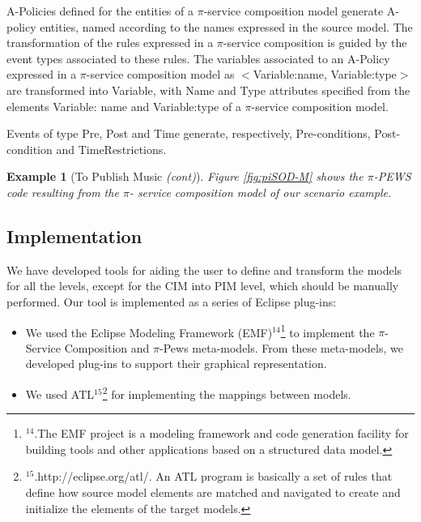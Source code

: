 \documentclass[12pt,twoside]{article}
\theoremstyle{plain}
\theoremstyle{plain}
\newtheorem{example}{Example}
\begin{document}
\begin{multicols}{2}

A-Policies defined for the entities of a $\pi$-service composition model generate {\sf A-policy} entities, named according to the names expres\-sed in the source model.
The transformation of the rules expres\-sed in a $\pi$-service composition is guided by the event types associated to these rules. 
The variables associated to an A-Policy expressed in a $\pi$-service composition model as {\sf $<$Variable:name, Variable:type$>$} are transformed into  {\sf Variable}, with  {\sf Name} and {\sf Type} attributes specified from the elements {\sf Variable: name} and {\sf Variable:type} of a $\pi$-service composition model.

Events of type {\sf Pre}, {\sf Post} and {\sf Time} generate, respectively, {\sf Pre-conditions}, {\sf Post-condition} and {\sf TimeRestrictions}.

\begin{example}[To Publish Music \textit{(cont)}]\label{ex:toPublicMusicT6}
Figure \ref{fig:piSOD-M} shows the $\pi$-PEWS code resulting from the $\pi$- service composition model  of our scenario example.
\end{example}


\subsection{Implementation}
We have developed tools for aiding the user to define and transform the models for all the levels, except for the CIM into PIM level, which should be manually performed.
Our tool is implemented as a series of Eclipse plug-ins: 
\begin{itemize}
\item 	We  used the Eclipse Modeling Framework (EMF)$^{14}$\footnote{$^{14}$.The EMF project is a modeling framework and code generation facility for building tools and other applications based on a structured data model.}   to implement the  $\pi$-Service Composition and $\pi$-{\sc Pews}  meta-models. 
From these meta-models, we  developed plug-ins to support their graphical representation.

\item	 We used  ATL$^{15}$\footnote{$^{15}$.http://eclipse.org/atl/. An ATL program is basically a set of rules that define how source model elements are matched and navigated to create and initialize the elements of the target models.}
for implementing the  mappings between models.


\end{itemize}
\end{multicols}
\end{document}
